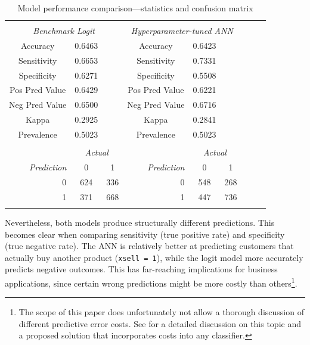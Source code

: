 \documentclass[12pt,a4paper]{article}
\let\code=\texttt
\begin{document}
\begin{table}[!htbp] \centering
\caption{Model performance comparison---statistics and confusion matrix}
\label{tab_comparemodel} 
{\small
\begin{tabular}{@{\extracolsep{5pt}} ccccccccc} 
\\[-1.8ex]\hline 
\hline \\[-1.8ex] 
\multicolumn{3}{c}{\textit{Benchmark Logit}} & \multicolumn{3}{c}{\textit{Hyperparameter-tuned ANN}} \\ \hline
Accuracy & 0.6463 &  & Accuracy & 0.6423 &  \\
Sensitivity & 0.6653 &  & Sensitivity & 0.7331 &  \\
Specificity & 0.6271 &  & Specificity & 0.5508 &  \\
Pos Pred Value & 0.6429 &  & Pos Pred Value & 0.6221 &  \\
Neg Pred Value & 0.6500 &  & Neg Pred Value & 0.6716 &  \\
Kappa & 0.2925 &  & Kappa & 0.2841 &  \\
Prevalence & 0.5023 &  & Prevalence & 0.5023 &  \\
\hline \\[-1.8ex] 
 & \multicolumn{2}{c}{\textit{Actual}} &  & \multicolumn{2}{c}{\textit{Actual}} \\
\multicolumn{1}{r}{\textit{Prediction}} & 0 & \multicolumn{1}{c}{1} & \multicolumn{1}{r}{\textit{Prediction}} & 0 & \multicolumn{1}{c}{1} \\ 
\multicolumn{1}{r}{0} & 624 & \multicolumn{1}{c}{336} & \multicolumn{1}{r}{0} & 548 & \multicolumn{1}{c}{268} \\
\multicolumn{1}{r}{1} & 371 & \multicolumn{1}{c}{668} & \multicolumn{1}{r}{1} & 447 & \multicolumn{1}{c}{736} \\
\hline \\[-1.8ex] 
\end{tabular}
}
\end{table}
Nevertheless, both models produce structurally different predictions.
This becomes clear when comparing sensitivity (true positive rate) and specificity (true negative rate).
The ANN is relatively better at predicting customers that actually buy another product (\code{xsell = 1}),
while the logit model more accurately predicts negative outcomes.
This has far-reaching implications for business applications, since certain wrong predictions might be more costly than others\footnote{The scope of this paper does unfortunately not allow a thorough discussion of different predictive error costs. See \cite{domingosMetaCostGeneralMethod1999} for a detailed discussion on this topic and a proposed solution that incorporates costs into any classifier.}.
\end{document}
